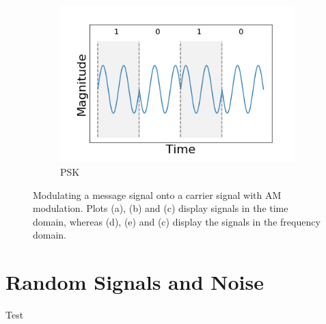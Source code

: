 \documentclass[]{article}
\begin{document}
\begin{figure}[h!]
\begin{subfigure}[b]{0.3\textwidth}
		\includegraphics[width=\textwidth]{figs/shift_keying/phase_shift_keying.png}
		\caption{PSK}
		\label{fig:am_modulated_signal}
	\end{subfigure}
	\caption{Modulating a message signal onto a carrier signal with AM modulation. Plots (a), (b) and (c) display signals in the time domain, whereas (d), (e) and (c) display the signals in the frequency domain.}\label{fig:am_modulation}
\end{figure}

\newpage
\section{Random Signals and Noise}
Test


\newpage

\end{document}
